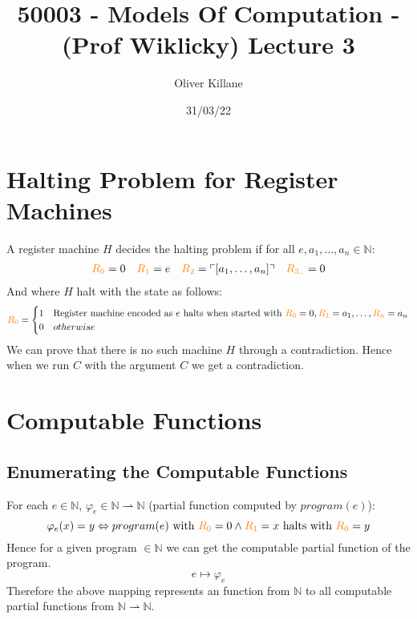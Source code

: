 \documentclass{report}
\title{50003 - Models Of Computation - (Prof Wiklicky) Lecture 3}
\author{Oliver Killane}
\date{31/03/22}
\begin{document}
\maketitle
{}

\section*{Halting Problem for Register Machines}
A register machine $H$ decides the halting problem if for all $e, a_1, \dots, a_n \in \mathbb{N}$:
\[\begin{matrix}
		\text{\textcolor{orange}{$R_{0}$}} = 0 & \text{\textcolor{orange}{$R_{1}$}} = e & \text{\textcolor{orange}{$R_{2}$}} = \ulcorner [a_1, \dots, a_n]\urcorner & \text{\textcolor{orange}{$R_{3..}$}} = 0 \\
	\end{matrix}\]
And where $H$ halt with the state as follows:
\[\text{\textcolor{orange}{$R_{0}$}} = \begin{cases}
		1 & \text{Register machine encoded as $e$ halts when started with $\text{\textcolor{orange}{$R_{0}$}} = 0, \text{\textcolor{orange}{$R_{1}$}} = a_1, \dots, \text{\textcolor{orange}{$R_{n}$}} = a_n$} \\
		0 & otherwise                                                                                                                        \\
	\end{cases}\]
We can prove that there is no such machine $H$ through a contradiction.
Hence when we run $C$ with the argument $C$ we get a contradiction.
\section*{Computable Functions}
\subsection*{Enumerating the Computable Functions}
For each $e \in \mathbb{N}$, $\varphi_e \in \mathbb{N} \rightharpoonup \mathbb{N}$ (partial function computed by $program(e)$):
\[\varphi_e(x) = y \Leftrightarrow program(e) \text{ with } \text{\textcolor{orange}{$R_{0}$}} = 0 \land \text{\textcolor{orange}{$R_{1}$}} = x \text{ halts with } \text{\textcolor{orange}{$R_{0}$}} = y\]
Hence for a given program $\in \mathbb{N}$ we can get the computable partial function of the program.
\[e \mapsto \varphi_e\]
Therefore the above mapping represents an  function from $\mathbb{N}$ to all computable partial functions from $\mathbb{N} \rightharpoonup \mathbb{N}$.
\end{document}
